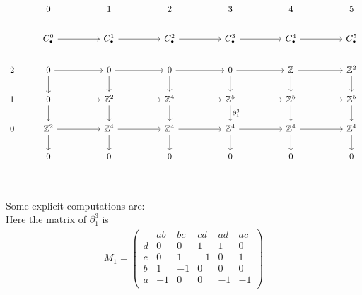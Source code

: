 \documentclass[11pt,a4paper]{report}
\begin{document}
\begin{Ex}
              \[
                \begin{tikzcd}[ampersand replacement=\&, sep=normal]
                  \& 0     \&\& 1    \&\& 2     \&\& 3     \&\& 4     \&\& 5\\
                  \& C_\bullet^0 \arrow[rr] \&\& C_\bullet^1 \arrow[rr] \&\& C_\bullet^2 \arrow[rr] \&\& C_\bullet^3 \arrow[rr] \&\& C_\bullet^4 \arrow[rr] \&\& C_\bullet^5\\
                  2 \& 0 \arrow[d]  \arrow[rr]           \&\& 0 \arrow[d]  \arrow[rr]           \&\& 0 \arrow[d]  \arrow[rr]           \&\& 0 \arrow[d]  \arrow[rr]           \&\& \mathbb{Z} \arrow[rr] \arrow[d]  \&\& \mathbb{Z}^2 \arrow[d]\\
                  1 \& 0 \arrow[d]  \arrow[rr]           \&\& \mathbb{Z}^2 \arrow[rr] \arrow[d] \&\& \mathbb{Z}^4 \arrow[rr] \arrow[d] \&\& \mathbb{Z}^5 \arrow[rr] \arrow[d,"\partial_1^3"] \&\& \mathbb{Z}^5 \arrow[rr] \arrow[d] \&\& \mathbb{Z}^5 \arrow[d]\\
                  0 \& \mathbb{Z}^2 \arrow[rr] \arrow[d] \&\& \mathbb{Z}^4 \arrow[rr] \arrow[d] \&\& \mathbb{Z}^4 \arrow[rr] \arrow[d] \&\& \mathbb{Z}^4 \arrow[rr] \arrow[d] \&\& \mathbb{Z}^4 \arrow[rr] \arrow[d] \&\& \mathbb{Z}^4 \arrow[d]\\
                  \& 0 \&\& 0 \&\& 0 \&\& 0 \&\& 0 \&\& 0\\
                \end{tikzcd}
              \]
              \\
              Some explicit computations are: \\
              Here the matrix of $\partial_1^3$ is\\
              \begin{align*}
                M_1 = \left(\begin{array}{c|ccccc}
                        &ab&bc&cd&ad&ac\\\hline
                        d&0&0&1&1&0\\
                        c&0&1&-1&0&1\\
                        b&1&-1&0&0&0\\
                        a&-1&0&0&-1&-1\\
                      \end{array}\right)
              \end{align*}
              \end{Ex}
\end{document}

